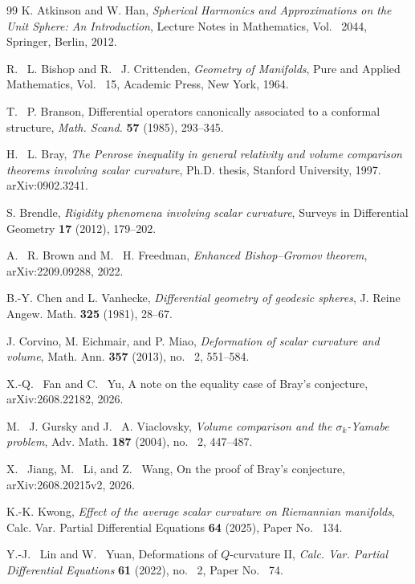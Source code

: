\documentclass[11pt, reqno]{amsart}
\begin{document}
\begin{thebibliography}{99}
K. Atkinson and W. Han,
\emph{Spherical Harmonics and Approximations on the Unit Sphere:
An Introduction},
Lecture Notes in Mathematics, Vol. ~2044,
Springer, Berlin, 2012.

R. ~L. Bishop and R. ~J. Crittenden,
\emph{Geometry of Manifolds},
Pure and Applied Mathematics, Vol. ~15, Academic Press, New York, 1964.

T. ~P. Branson,
\newblock Differential operators canonically associated to a conformal structure,
\newblock \emph{Math. Scand.} \textbf{57} (1985), 293--345.

H. ~L. Bray,
\emph{The Penrose inequality in general relativity and volume comparison
theorems involving scalar curvature},
Ph.D. thesis, Stanford University, 1997.
{arXiv:0902.3241}.

S. Brendle,
\emph{Rigidity phenomena involving scalar curvature},
Surveys in Differential Geometry \textbf{17} (2012), 179--202.

A. ~R. Brown and M. ~H. Freedman,
\emph{Enhanced Bishop--Gromov theorem},
{arXiv:2209.09288}, 2022.

B.-Y. Chen and L. Vanhecke,
\emph{Differential geometry of geodesic spheres},
J. Reine Angew. Math. \textbf{325} (1981), 28--67.

J. Corvino, M. Eichmair, and P. Miao,
\emph{Deformation of scalar curvature and volume},
Math. Ann. \textbf{357} (2013), no. ~2, 551--584.

X.-Q. ~Fan and C. ~Yu,
\newblock A note on the equality case of Bray's conjecture,
\newblock arXiv:2608.22182, 2026.

M. ~J. Gursky and J. ~A. Viaclovsky,
\emph{Volume comparison and the $\sigma_k$-Yamabe problem},
Adv. Math. \textbf{187} (2004), no. ~2, 447--487.

X. ~Jiang, M. ~Li, and Z. ~Wang,
\newblock On the proof of Bray's conjecture,
\newblock arXiv:2608.20215v2, 2026.

K.-K. Kwong,
\emph{Effect of the average scalar curvature on Riemannian manifolds},
Calc. Var. Partial Differential Equations \textbf{64} (2025),
Paper No. ~134.

Y.-J. ~Lin and W. ~Yuan,
\newblock Deformations of $Q$-curvature II,
\newblock \emph{Calc. Var. Partial Differential Equations} \textbf{61} (2022), no. ~2, Paper No. ~74.


\end{thebibliography}
\end{document}
